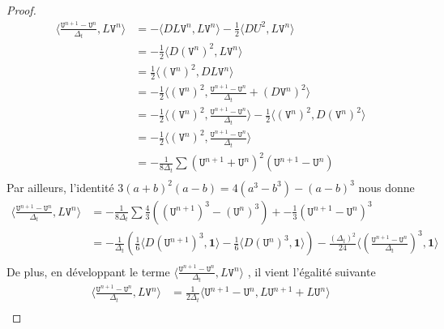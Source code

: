 \documentclass[12pt,a4paper]{article}
\numberwithin{equation}{section}
\begin{document}
\begin{proof}
    \begin{align*}
        \langle \frac{\texttt{U}^{n+1}-\texttt{U}^{n}}{\Delta_t} , L\texttt{V}^n \rangle &= -\langle DL\texttt{V}^n, L\texttt{V}^n \rangle -\frac{1}{2}\langle DU^2, L\texttt{V}^n \rangle \\
        & = -\frac{1}{2} \langle D(\texttt{V}^n)^2, L\texttt{V}^n \rangle \\
        & = \frac{1}{2}\langle (\texttt{V}^n)^2, DL\texttt{V}^n \rangle \\
        & = -\frac{1}{2}\langle (\texttt{V}^n)^2,  \frac{\texttt{U}^{n+1}-\texttt{U}^{n}}{\Delta_t} + (D\texttt{V}^n)^2 \rangle \\
        & = -\frac{1}{2}\langle (\texttt{V}^n)^2, \frac{\texttt{U}^{n+1}-\texttt{U}^{n}}{\Delta_t} \rangle - \frac{1}{2}\langle (\texttt{V}^n)^2,  D(\texttt{V}^n)^2 \rangle \\
        & = -\frac{1}{2}\langle (\texttt{V}^n)^2, \frac{\texttt{U}^{n+1}-\texttt{U}^{n}}{\Delta_t} \rangle\\
        & = -\frac{1}{8\Delta_t}\sum (\texttt{U}^{n+1} +\texttt{U}^{n} )^2(\texttt{U}^{n+1}-\texttt{U}^{n}) \\
    \end{align*}
    Par ailleurs, l'identité $3(a+b)^2(a-b) = 4(a^3 -b^3) - (a-b)^3$ nous donne
    \begin{equation}\label{energy_num_dem1}
        \begin{aligned}
        \langle \frac{\texttt{U}^{n+1}-\texttt{U}^{n}}{\Delta_t} , L\texttt{V}^n \rangle& = -\frac{1}{8\Delta_t}\sum \frac{4}{3}((\texttt{U}^{n+1})^3 - (\texttt{U}^{n})^3) + - \frac{1}{3}(\texttt{U}^{n+1} - \texttt{U}^{n})^3\\
        & = -\frac{1}{\Delta_t} \left(\frac{1}{6}\langle D(\texttt{U}^{n+1})^3, \textbf{1}\rangle - \frac{1}{6}\langle D(\texttt{U}^{n})^3, \textbf{1}\rangle\right) - \frac{(\Delta_t)^2}{24}\langle\left(\frac{\texttt{U}^{n+1} - \texttt{U}^{n}}{\Delta_t}\right)^3, \textbf{1}\rangle\\
        \end{aligned}
    \end{equation}
    De plus, en développant le terme $\langle \frac{\texttt{U}^{n+1}-\texttt{U}^{n}}{\Delta_t} , L\texttt{V}^n \rangle$ , il vient l'égalité suivante
    \begin{align*}
        \langle \frac{\texttt{U}^{n+1}-\texttt{U}^{n}}{\Delta_t} , L\texttt{V}^n \rangle& = \frac{1}{2\Delta_t}\langle \texttt{U}^{n+1}-\texttt{U}^{n}  ,L\texttt{U}^{n+1}+L\texttt{U}^{n} \rangle\\

\end{align*}
\end{proof}
\end{document}
